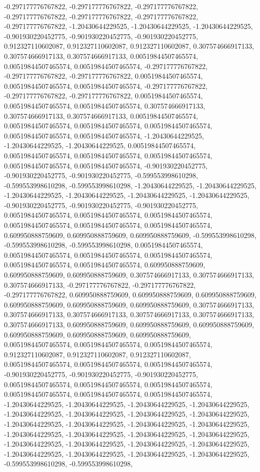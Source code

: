\documentclass[
  ,man]{apa6}
\begin{document}
-0.297177776767822, -0.297177776767822, -0.297177776767822, -0.297177776767822, -0.297177776767822, -0.297177776767822, -0.297177776767822, -1.20430644229525, -1.20430644229525, -1.20430644229525, -0.901930220452775, -0.901930220452775, -0.901930220452775, 0.912327110602087, 0.912327110602087, 0.912327110602087, 0.307574666917133, 0.307574666917133, 0.307574666917133, 0.00519844507465574, 0.00519844507465574, 0.00519844507465574, -0.297177776767822, -0.297177776767822, -0.297177776767822, 0.00519844507465574,
0.00519844507465574, 0.00519844507465574, -0.297177776767822, -0.297177776767822, -0.297177776767822, 0.00519844507465574, 0.00519844507465574, 0.00519844507465574, 0.307574666917133, 0.307574666917133, 0.307574666917133, 0.00519844507465574, 0.00519844507465574, 0.00519844507465574, 0.00519844507465574, 0.00519844507465574, 0.00519844507465574, -1.20430644229525, -1.20430644229525, -1.20430644229525, 0.00519844507465574, 0.00519844507465574, 0.00519844507465574, 0.00519844507465574, 0.00519844507465574,
0.00519844507465574, -0.901930220452775, -0.901930220452775, -0.901930220452775, -0.599553998610298, -0.599553998610298, -0.599553998610298, -1.20430644229525, -1.20430644229525, -1.20430644229525, -1.20430644229525, -1.20430644229525, -1.20430644229525, -0.901930220452775, -0.901930220452775, -0.901930220452775, 0.00519844507465574, 0.00519844507465574, 0.00519844507465574, 0.00519844507465574, 0.00519844507465574, 0.00519844507465574, 0.609950888759609, 0.609950888759609, 0.609950888759609, -0.599553998610298,
-0.599553998610298, -0.599553998610298, 0.00519844507465574, 0.00519844507465574, 0.00519844507465574, 0.00519844507465574, 0.00519844507465574, 0.00519844507465574, 0.609950888759609, 0.609950888759609, 0.609950888759609, 0.307574666917133, 0.307574666917133, 0.307574666917133, -0.297177776767822, -0.297177776767822, -0.297177776767822, 0.609950888759609, 0.609950888759609, 0.609950888759609, 0.609950888759609, 0.609950888759609, 0.609950888759609, 0.307574666917133, 0.307574666917133, 0.307574666917133,
0.307574666917133, 0.307574666917133, 0.307574666917133, 0.609950888759609, 0.609950888759609, 0.609950888759609, 0.609950888759609, 0.609950888759609, 0.609950888759609, 0.00519844507465574, 0.00519844507465574, 0.00519844507465574, 0.912327110602087, 0.912327110602087, 0.912327110602087, 0.00519844507465574, 0.00519844507465574, 0.00519844507465574, -0.901930220452775, -0.901930220452775, -0.901930220452775, 0.00519844507465574, 0.00519844507465574, 0.00519844507465574, 0.00519844507465574, 0.00519844507465574,
0.00519844507465574, -1.20430644229525, -1.20430644229525, -1.20430644229525, -1.20430644229525, -1.20430644229525, -1.20430644229525, -1.20430644229525, -1.20430644229525, -1.20430644229525, -1.20430644229525, -1.20430644229525, -1.20430644229525, -1.20430644229525, -1.20430644229525, -1.20430644229525, -1.20430644229525, -1.20430644229525, -1.20430644229525, -1.20430644229525, -1.20430644229525, -1.20430644229525, -1.20430644229525, -1.20430644229525, -1.20430644229525, -0.599553998610298, -0.599553998610298,
\end{document}
